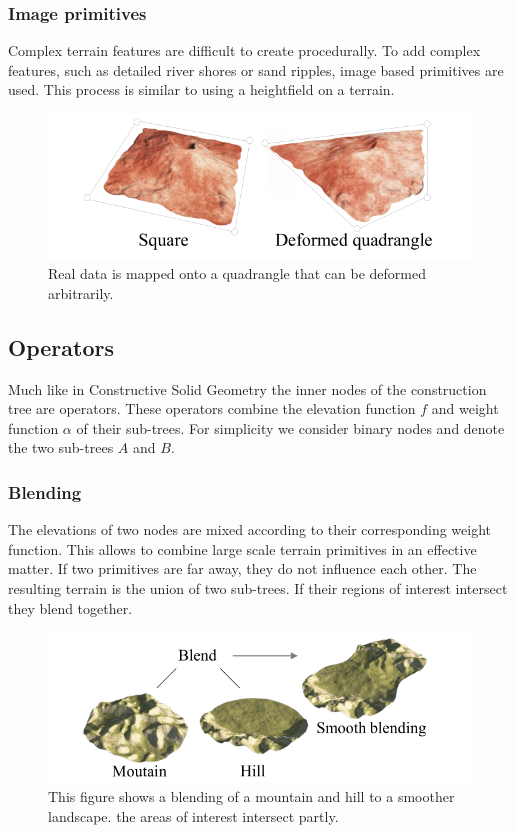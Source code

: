 \subsubsection{Image primitives}
Complex terrain features are difficult to create procedurally. To add complex features, such as detailed river shores or sand ripples, image based primitives are used. This process is similar to using a heightfield on a terrain. 

\begin{figure}[htb]
	\centering
	\includegraphics[width=.8\linewidth]{GGP15/image_primitive}
	\caption{Real data is mapped onto a quadrangle that can be deformed arbitrarily.}
	\label{fig:image_primitive}
\end{figure}


\subsection{Operators}
Much like in Constructive Solid Geometry the inner nodes of the construction tree are operators. These operators combine the elevation function $f$ and weight function $\alpha$ of their sub-trees. For simplicity we consider binary nodes and denote the two sub-trees $A$ and $B$. 

\subsubsection{Blending}
The elevations of two nodes are mixed according to their corresponding weight function. This allows to combine large scale terrain primitives in an effective matter. If two primitives are far away, they do not influence each other. The resulting terrain is the union of two sub-trees. If their regions of interest intersect they blend together.
\begin{figure}[htb]
	\centering
	\includegraphics[width=.8\linewidth]{GGP15/blend_operator}
	\caption{This figure shows a blending of a mountain and hill to a smoother landscape. the areas of interest intersect partly. }
	\label{fig:blend_operator}
\end{figure}
